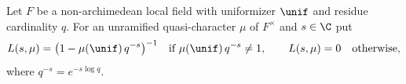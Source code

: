 Let $F$ be a non-archimedean local field with uniformizer $\unif$ and residue cardinality $q$. For an unramified
quasi-character $\mu$ of $F^\times$ and $s\in\C$ put
\[
  L(s,\mu)=\bigl(1-\mu(\unif)\,q^{-s}\bigr)^{-1}\quad\text{if }\mu(\unif)\,q^{-s}\neq1,\qquad L(s,\mu)=0\quad\text{otherwise},
\]
where $q^{-s}=e^{-s\log q}$.
